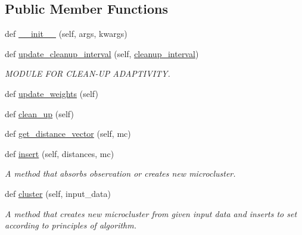 \subsection*{Public Member Functions}
\begin{DoxyCompactItemize}
\item 
def \hyperlink{classStreamClusteringAlgorithms_1_1evoStream_1_1v1_1_1Algorithm_1_1EvoStreamV1_1_1EvoStreamV1_a267ae54d21a6d55321f32dcdd62439aa}{\+\_\+\+\_\+init\+\_\+\+\_\+} (self, args, kwargs)
\item 
def \hyperlink{classStreamClusteringAlgorithms_1_1evoStream_1_1v1_1_1Algorithm_1_1EvoStreamV1_1_1EvoStreamV1_a9533e30378b9198d1afacb7f30796cb5}{update\+\_\+cleanup\+\_\+interval} (self, \hyperlink{classStreamClusteringAlgorithms_1_1evoStream_1_1v1_1_1Algorithm_1_1EvoStreamV1_1_1EvoStreamV1_a46771a05845bae3fc47e2b5a2dc35a9b}{cleanup\+\_\+interval})
\begin{DoxyCompactList}\small\item\em M\+O\+D\+U\+LE F\+OR C\+L\+E\+A\+N-\/\+UP A\+D\+A\+P\+T\+I\+V\+I\+TY. \end{DoxyCompactList}\item 
def \hyperlink{classStreamClusteringAlgorithms_1_1evoStream_1_1v1_1_1Algorithm_1_1EvoStreamV1_1_1EvoStreamV1_a993300bd3531f41834ac0eda9f78c021}{update\+\_\+weights} (self)
\item 
def \hyperlink{classStreamClusteringAlgorithms_1_1evoStream_1_1v1_1_1Algorithm_1_1EvoStreamV1_1_1EvoStreamV1_a519bc4af98ff4b3223439b266d67ab7b}{clean\+\_\+up} (self)
\item 
def \hyperlink{classStreamClusteringAlgorithms_1_1evoStream_1_1v1_1_1Algorithm_1_1EvoStreamV1_1_1EvoStreamV1_ab73522db04392f0469b83d6e01e7f3ac}{get\+\_\+distance\+\_\+vector} (self, mc)
\item 
def \hyperlink{classStreamClusteringAlgorithms_1_1evoStream_1_1v1_1_1Algorithm_1_1EvoStreamV1_1_1EvoStreamV1_ac8fc05e3dcf3c265704f61b825fd82cb}{insert} (self, distances, mc)
\begin{DoxyCompactList}\small\item\em A method that absorbs observation or creates new microcluster. \end{DoxyCompactList}\item 
def \hyperlink{classStreamClusteringAlgorithms_1_1evoStream_1_1v1_1_1Algorithm_1_1EvoStreamV1_1_1EvoStreamV1_a14b9ea4cd658b3bd85569fc256c07612}{cluster} (self, input\+\_\+data)
\begin{DoxyCompactList}\small\item\em A method that creates new microcluster from given input data and inserts to set according to principles of algorithm. \end{DoxyCompactList}\item 

\end{DoxyCompactItemize}

